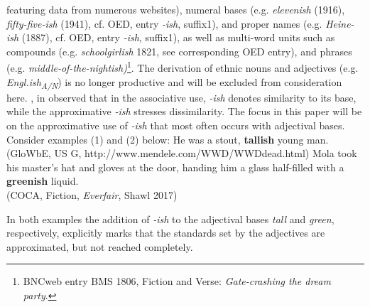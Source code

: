 \documentclass[output=paper
,modfonts
,nonflat]{langsci/langscibook}
\begin{document}
featuring data from numerous websites), numeral bases (e.g.  \textit{elevenish} (1916),  \textit{fifty-five-ish} (1941), cf. OED, entry \textit{-ish}, suffix1), and proper names (e.g.  \textit{Heine-ish} (1887), cf. OED, entry \textit{-ish}, suffix1), as well as multi-word units such as compounds (e.g.  \textit{schoolgirlish} 1821, see corresponding OED entry), and phrases (e.g.  \textit{middle-of-the-nightish)}\footnote{BNCweb entry \cite{BNCweb} BMS 1806, Fiction and Verse: \textit{Gate-crashing the dream party}.}. The derivation of ethnic nouns and adjectives (e.g.  \textit{Engl.ish\textsubscript{A/N}}) is no longer productive and will be excluded from consideration here. \textcite{Kuzmack2007}, in \textcite*[234]{Traugott2013} observed that in the associative use,  \textit{-ish} denotes similarity to its base, while the approximative  \textit{-ish} stresses dissimilarity. The focus in this paper will be on the approximative use of  \textit{-ish} that most often occurs with adjectival bases. Consider examples (1) and (2) below:
\ea
	He was a stout, \textbf{tallish} young man. \\ (GloWbE, US G, http://www.mendele.com/WWD/WWDdead.html)
\z
\ea
	Mola took his master's hat and gloves at the door, handing him a glass half-filled with a \textbf{greenish} liquid. \\ (COCA, Fiction, \textit{Everfair}, Shawl 2017)
\z

In both examples the addition of \textit{-ish} to the adjectival bases  \textit{tall} and  \textit{green}, respectively, explicitly marks that the standards set by the adjectives are approximated, but not reached completely.
\end{document}
